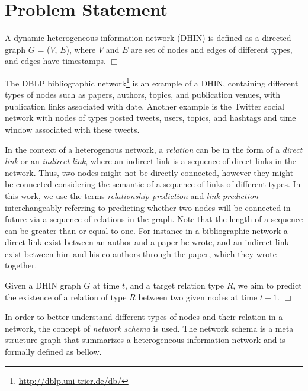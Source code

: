 \section{Problem Statement}

\begin{definition}
A dynamic heterogeneous information network (DHIN) is defined as a directed graph $G$ = ($V$, $E$), where $V$ and $E$ are set of nodes and edges of different types, and edges have timestamps. $\Box$ 
\end{definition}

The DBLP bibliographic network\footnote{\url{http://dblp.uni-trier.de/db/}} is an example of a DHIN, containing different types of nodes such as papers, authors, topics, and publication venues, with publication links associated with date. Another example is the Twitter social network with nodes of types posted tweets, users, topics, and hashtags and time window associated with these tweets. %

In the context of a heterogenous network, a \textit{relation} can be in the form of a \textit{direct link} or an \textit{indirect link}, where an indirect link is a sequence of direct links in the network. Thus, two nodes might not be directly connected, however they might be connected considering the semantic of a sequence of links of different types. In this work, we use the terms \textit{relationship prediction} and \textit{link prediction} interchangeably referring to predicting whether two nodes will be connected in future via a sequence of relations in the graph. Note that the length of a sequence can be greater than or equal to one. For instance in a bibliographic network a direct link exist between an author and a paper he wrote, and an indirect link exist between him and his co-authors through the paper, which they wrote together.

\begin{definition}\label{problemdef}
Given a DHIN graph $G$ at time $t$, and a target relation type $R$, we aim to predict the existence of a relation of type $R$ between two given nodes at time $t+1$. $\Box$
 \end{definition}

In order to better understand different types of nodes and their relation in a network, the concept of \textit{network schema} \cite{sun2011pathsim} is used. The network schema is a meta structure graph that summarizes a heterogeneous information network and is formally defined as bellow.

